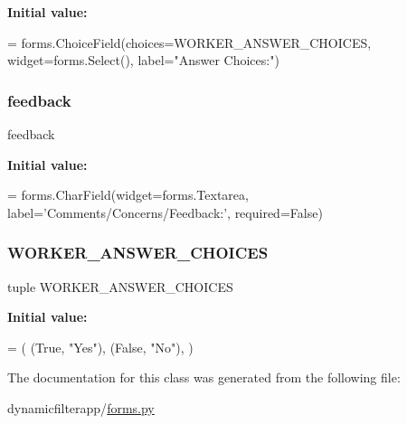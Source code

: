 {\bfseries Initial value\+:}
\begin{DoxyCode}
=  forms.ChoiceField(choices=WORKER\_ANSWER\_CHOICES, 
        widget=forms.Select(), label=\textcolor{stringliteral}{"Answer Choices:"})
\end{DoxyCode}
\mbox{\label{classdynamicfilterapp_1_1forms_1_1_worker_form_aecc50b4643d1ea45de7afe20e729c160}} 
\subsubsection{\texorpdfstring{feedback}{feedback}}
{\footnotesize\ttfamily feedback\hspace{0.3cm}{\ttfamily [static]}}

{\bfseries Initial value\+:}
\begin{DoxyCode}
=  forms.CharField(widget=forms.Textarea, 
        label=\textcolor{stringliteral}{'Comments/Concerns/Feedback:'}, required=\textcolor{keyword}{False})
\end{DoxyCode}
\mbox{\label{classdynamicfilterapp_1_1forms_1_1_worker_form_a82a7fc5c5e889c4eb0460d3f1638425b}} 
\subsubsection{\texorpdfstring{W\+O\+R\+K\+E\+R\+\_\+\+A\+N\+S\+W\+E\+R\+\_\+\+C\+H\+O\+I\+C\+ES}{WORKER\_ANSWER\_CHOICES}}
{\footnotesize\ttfamily tuple W\+O\+R\+K\+E\+R\+\_\+\+A\+N\+S\+W\+E\+R\+\_\+\+C\+H\+O\+I\+C\+ES\hspace{0.3cm}{\ttfamily [static]}}

{\bfseries Initial value\+:}
\begin{DoxyCode}
=  (
        (\textcolor{keyword}{True}, \textcolor{stringliteral}{"Yes"}),
        (\textcolor{keyword}{False}, \textcolor{stringliteral}{"No"}),
    )
\end{DoxyCode}


The documentation for this class was generated from the following file\+:\begin{DoxyCompactItemize}
\item 
dynamicfilterapp/\hyperlink{forms_8py}{forms.\+py}\end{DoxyCompactItemize}
